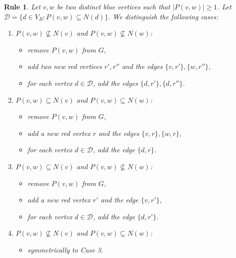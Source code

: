 \documentclass[a4paper,11pt]{article}
\newtheorem{rgl}  {Rule}
\begin{document}
\begin{rgl}  \label{rgl_pair}            Let $v,w$ be two distinct blue vertices such that $|P(v,w)| \geq 1$.
Let $\mathcal{D} = \{d \in V_B: P(v,w) \subseteq N(d)  \}$.
We distinguish the following cases:
\begin{enumerate}

\item $P(v,w) \nsubseteq N(v)$ and $P(v,w) \nsubseteq N(w)$:

\begin{itemize}\itemsep0em
\item remove $P(v,w)$ from $G$,
\item add two new red vertices $r',r''$ and the edges $\{v,r' \},\{w,r'' \}$,
\item for each vertex $d \in \mathcal{D}$, add the edges $\{d,r' \},\{d,r'' \} $.
\end{itemize}



\item $P(v,w) \subseteq N(v)$ and $P(v,w) \subseteq N(w)$:

\begin{itemize}\itemsep0em
\item remove $P(v,w)$ from $G$,
\item add a new red vertex $r$ and the edges $\{v,r \},\{w,r \}$,
\item for each vertex {$d \in \mathcal{D}$}, add the edge $\{d,r \}$.
\end{itemize}

\item $P(v,w) \subseteq N(v)$ and $P(v,w) \nsubseteq N(w)$:

\begin{itemize}\itemsep0em
\item remove $P(v,w)$ from $G$,
\item add a new red vertex $r'$ and the edge $\{v,r' \}$,
\item for each vertex {$d \in \mathcal{D}$}, add the edge $\{d,r' \}$.


\end{itemize}

\item $P(v,w) \nsubseteq N(v)$ and $P(v,w) \subseteq N(w)$:

\begin{itemize}
\item symmetrically to Case 3.
\end{itemize}


\end{enumerate}
\end{rgl}
\end{document}

